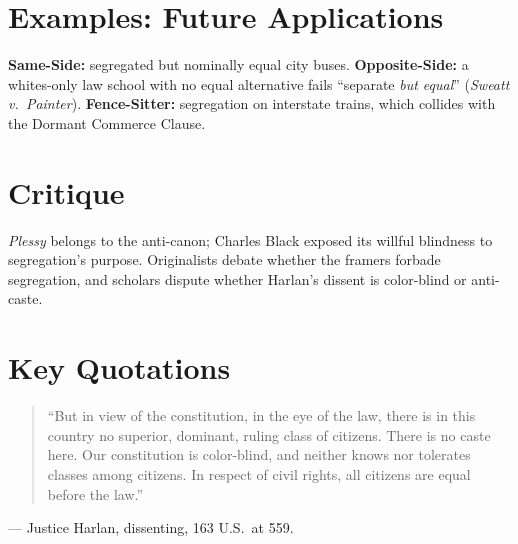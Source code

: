 \documentclass[12pt]{article}
\begin{document}
\section{Examples: Future Applications}
\textbf{Same-Side:} segregated but nominally equal city buses. \textbf{Opposite-Side:} a whites-only law school with no equal alternative fails ``separate \textit{but equal}'' (\textit{Sweatt v.\ Painter}). \textbf{Fence-Sitter:} segregation on interstate trains, which collides with the Dormant Commerce Clause.

\section{Critique}
\textit{Plessy} belongs to the anti-canon; Charles Black exposed its willful blindness to segregation's purpose. Originalists debate whether the framers forbade segregation, and scholars dispute whether Harlan's dissent is color-blind or anti-caste.

\section{Key Quotations}
\begin{quote}
``But in view of the constitution, in the eye of the law, there is in this country no superior, dominant, ruling class of citizens. There is no caste here. Our constitution is color-blind, and neither knows nor tolerates classes among citizens. In respect of civil rights, all citizens are equal before the law.''
\end{quote}
\noindent --- Justice Harlan, dissenting, 163 U.S.\ at 559.
\end{document}
